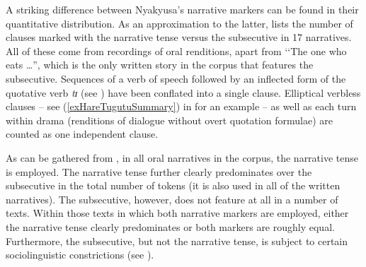 A striking difference between Nyakyusa's narrative markers can be found in their quantitative distribution. As an approximation to the latter,  lists the number of clauses marked with the narrative tense versus the subsecutive in 17 narratives. All of these come from recordings of oral renditions, apart from \lq\lq The one who eats \ldots'', which is the only written story in the corpus that features the subsecutive. Sequences of a verb of speech followed by an inflected form of the quotative verb \textit{tɪ} (see ) have been conflated into a single clause. Elliptical verbless clauses  -- see (\ref{exHareTugutuSummary}) in  for an example -- as well as each turn within drama (renditions of dialogue without overt quotation formulae) are counted as one independent clause.

As can be gathered from , in all oral narratives in the corpus, the narrative tense is employed. The narrative tense further clearly predominates over the subsecutive in the total number of tokens (it is also used in all of the written narratives). The subsecutive, however, does not feature at all in a number of texts. Within those texts in which both narrative markers are employed, either the narrative tense clearly predominates or both markers are roughly equal. Furthermore, the subsecutive, but not the narrative tense, is subject to certain sociolinguistic constrictions (see ).

